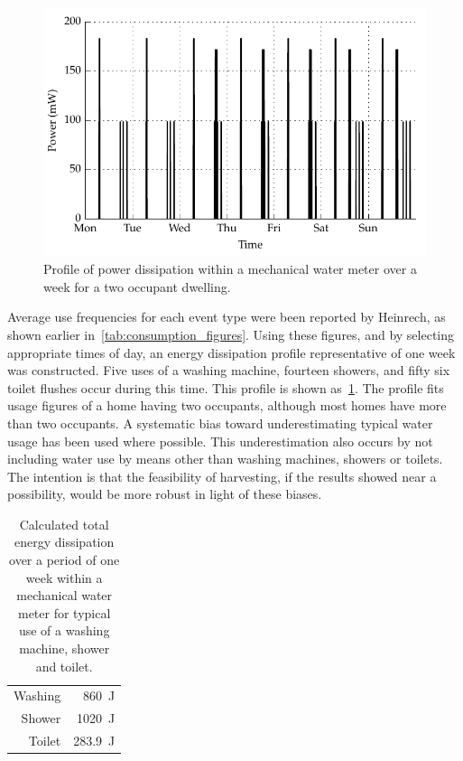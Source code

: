     \begin{figure}
        \centering
        \includegraphics[width=\linewidth]{content/pt1/02-WirelessWaterMeter/graphics/graph_profileEnergy}
        \caption{
          \label{fig:profile_powerDissipation}
          Profile of power dissipation within a mechanical water meter over a week for a two occupant dwelling.
        }
    \end{figure}
    Average use frequencies for each event type were been reported by Heinrech, as shown earlier in~\cref{tab:consumption_figures}.
    Using these figures, and by selecting appropriate times of day, an energy dissipation profile representative of one week was constructed.
    Five uses of a washing machine, fourteen showers, and fifty six toilet flushes occur during this time.
    This profile is shown as~\cref{fig:profile_powerDissipation}.
    The profile fits usage figures of a home having two occupants, although most homes have more than two occupants.
    A systematic bias toward underestimating typical water usage has been used where possible.
    This underestimation also occurs by not including water use by means other than washing machines, showers or toilets.
    The intention is that the feasibility of harvesting, if the results showed near a possibility, would be more robust in light of these biases.
    \begin{table}
      \centering
      \begin{tabular}{r|r}
          Washing & \SI{860}{\joule}\\
          Shower  & \SI{1020}{\joule}\\
          Toilet  & \SI{283.9}{\joule}
      \end{tabular}
      \caption{
          \label{tab:energy_dissipation_total_figures}
          Calculated total energy dissipation over a period of one week within a mechanical water meter for typical use of a washing machine, shower and toilet.
      }
    \end{table}
